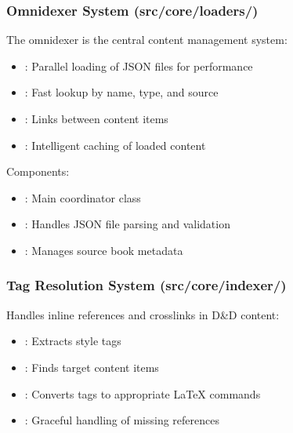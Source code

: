 \documentclass[letterpaper,10pt,english]{sphinxmanual}
\begin{document}
\subsubsection{Omnidexer System (src/core/loaders/)}
\label{\detokenize{developer/architecture:omnidexer-system-src-core-loaders}}
\sphinxAtStartPar
The omnidexer is the central content management system:
\begin{itemize}
\item {} 
\sphinxAtStartPar
{}: Parallel loading of JSON files for performance

\item {} 
\sphinxAtStartPar
{}: Fast lookup by name, type, and source

\item {} 
\sphinxAtStartPar
{}: Links between content items

\item {} 
\sphinxAtStartPar
{}: Intelligent caching of loaded content

\end{itemize}

\sphinxAtStartPar
Components:
\begin{itemize}
\item {} 
\sphinxAtStartPar
{}: Main coordinator class

\item {} 
\sphinxAtStartPar
{}: Handles JSON file parsing and validation

\item {} 
\sphinxAtStartPar
{}: Manages source book metadata

\end{itemize}


\subsubsection{Tag Resolution System (src/core/indexer/)}
\label{\detokenize{developer/architecture:tag-resolution-system-src-core-indexer}}
\sphinxAtStartPar
Handles inline references and cross\sphinxhyphen{}links in D\&D content:
\begin{itemize}
\item {} 
\sphinxAtStartPar
{}: Extracts  style tags

\item {} 
\sphinxAtStartPar
{}: Finds target content items

\item {} 
\sphinxAtStartPar
{}: Converts tags to appropriate LaTeX commands

\item {} 
\sphinxAtStartPar
{}: Graceful handling of missing references

\end{itemize}
\end{document}
